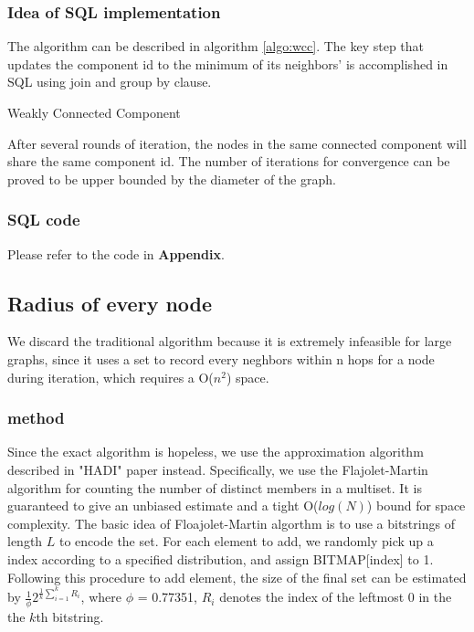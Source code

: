 \subsubsection{Idea of SQL implementation}
The algorithm can be described in algorithm \ref{algo:wcc}. The key step that updates the 
component id to the minimum of its neighbors' is accomplished in SQL using join and group by
clause.
\begin{algorithm}
\caption{Weakly Connected Component}
\begin{algorithmic}
\REPEAT
{}
\end{algorithmic}
\label{algo:wcc}
\end{algorithm}
After several rounds of iteration, the nodes in the same connected component will share the same component id.
The number of iterations for convergence can be proved to be upper bounded by the diameter of the graph.

\subsubsection{SQL code}
Please refer to the code in {\bf Appendix}.

\subsection{Radius of every node}
We discard the traditional algorithm because it is extremely infeasible for large graphs, since it uses a set to record every neghbors within n hops for a node during iteration, which requires a O($n^2$) space.
\subsubsection{method}
Since the exact algorithm is hopeless, we use the approximation algorithm described in "HADI" paper\cite{DBLP:journals/tkdd/KangTAFL11} instead. Specifically, we use the Flajolet-Martin algorithm for counting the number of distinct members in a multiset. It is guaranteed to give an unbiased estimate and a tight O($log(N)$) bound for space complexity. The basic idea of Floajolet-Martin algorthm is to use a bitstrings of length $L$ to encode the set. For each element to add, we randomly pick up a index according to a specified distribution, and assign BITMAP[index] to 1. Following this procedure to add element, the size of the final set can be estimated by $\frac{1}{\phi} 2^{\frac{1}{k}\sum_{i=1}^k R_i}$, where $\phi$ = 0.77351, $R_i$ denotes the index of the leftmost 0 in the the $k$th bitstring.

